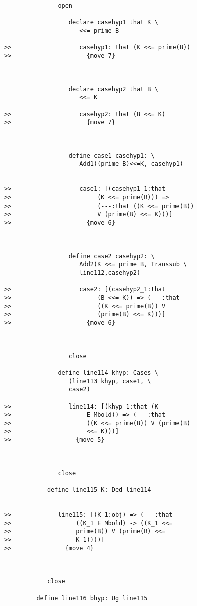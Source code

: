 \documentclass[12pt]{article}
\begin{document}
\begin{verbatim}
               open

                  declare casehyp1 that K \
                     <<= prime B

>>                   casehyp1: that (K <<= prime(B))
>>                     {move 7}



                  declare casehyp2 that B \
                     <<= K

>>                   casehyp2: that (B <<= K)
>>                     {move 7}



                  define case1 casehyp1: \
                     Add1((prime B)<<=K, casehyp1)


>>                   case1: [(casehyp1_1:that
>>                        (K <<= prime(B))) =>
>>                        (---:that ((K <<= prime(B))
>>                        V (prime(B) <<= K)))]
>>                     {move 6}



                  define case2 casehyp2: \
                     Add2(K <<= prime B, Transsub \
                     line112,casehyp2)

>>                   case2: [(casehyp2_1:that
>>                        (B <<= K)) => (---:that
>>                        ((K <<= prime(B)) V
>>                        (prime(B) <<= K)))]
>>                     {move 6}



                  close

               define line114 khyp: Cases \
                  (line113 khyp, case1, \
                  case2)

>>                line114: [(khyp_1:that (K
>>                     E Mbold)) => (---:that
>>                     ((K <<= prime(B)) V (prime(B)
>>                     <<= K)))]
>>                  {move 5}



               close

            define line115 K: Ded line114


>>             line115: [(K_1:obj) => (---:that
>>                  ((K_1 E Mbold) -> ((K_1 <<=
>>                  prime(B)) V (prime(B) <<=
>>                  K_1))))]
>>               {move 4}



            close

         define line116 bhyp: Ug line115



\end{verbatim}
\end{document}
